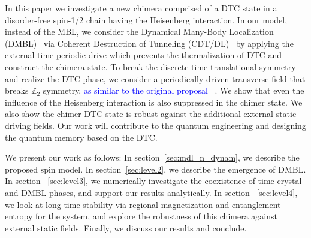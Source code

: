 \documentclass[
nofootinbib,
reprint,
superscriptaddress,
amsmath,amssymb,showkeys,
aps,
prb,
]{revtex4-2}
\newcommand{\blue}[1]{\textcolor{blue}{#1}}
\begin{document}
	In this paper we investigate a new chimera comprised of a DTC state in  a disorder-free spin-1/2 chain having the Heisenberg interaction. In our model, instead of the MBL, we consider the Dynamical Many-Body Localization (DMBL)~\cite{Keser2016, haldar_dynamical_2017, haldar_dynamical_2021,bhattacharyya_transverse_2012,aditya2023dynamical,dutta2014,das_exotic_2010} via Coherent Destruction of Tunneling (CDT/DL)~\cite{Grossmann1991,Kayanuma2008} by applying the external time-periodic drive which prevents the thermalization of DTC and construct the chimera state. To break the discrete time translational symmetry and realize the DTC phase, we consider a periodically driven transverse field that breaks $\mathbb{Z}_2$ symmetry, \blue{as similar to the original proposal~\cite{sakurai_phys_nodate} }. We show that even the influence of the Heisenberg interaction is also suppressed in the chimer state. We also show the chimer DTC state is robust against the additional external static driving fields. Our work will contribute to the quantum engineering and designing the quantum memory based on the DTC.\cite{zhang_observation_2017}
	
	We present our work as follows: In section~\ref{sec:mdl_n_dynam}, we describe the proposed spin model. In section~\ref{sec:level2}, we describe the emergence of DMBL. In section ~\ref{sec:level3}, we numerically investigate the coexistence of time crystal and DMBL phases, and support our results analytically. In section ~\ref{sec:level4}, we look at long-time stability via regional magnetization and  entanglement entropy for the system, and explore the robustness of this chimera against  external static fields. Finally, we discuss our results and conclude.
	
	
	
	
\end{document}
